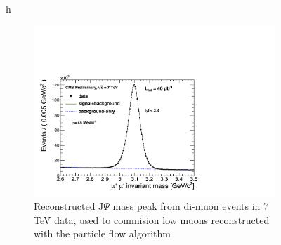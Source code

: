 \begin{figure}{h}
    \centering
    \begin{subfigure}[h]{0.40\textwidth}
        \includegraphics[width=\textwidth]{Figures/Reconstruction_Diagrams/MUO__JPsi40pb-1.pdf}
        \caption{Reconstructed J$\Psi$ mass peak from di-muon events
          in 7 TeV data, used to commision low \PT muons reconstructed
        with the particle flow algorithm}\label{fig:muon_jpsi_mass}
      \end{subfigure}
      ~ %
    \begin{subfigure}[h]{0.40\textwidth}

\end{subfigure}
\end{figure}
